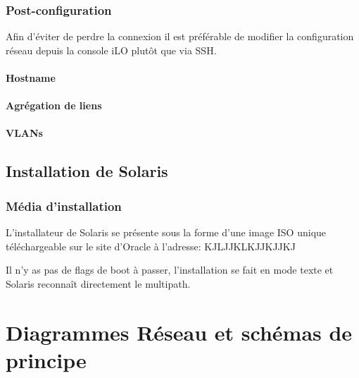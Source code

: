 \documentclass[a4paper,oneside]{report}
\begin{document}
\subsection{Post-configuration}
Afin d'éviter de perdre la connexion il est préférable de modifier la configuration réseau depuis la console iLO plutôt que via SSH.

\subsubsection{Hostname}

\subsubsection{Agrégation de liens}

\subsubsection{VLANs}

\section{Installation de Solaris} \label{sec:installsolaris}
\subsection{Média d'installation}
L'installateur de Solaris se présente sous la forme d'une image ISO unique téléchargeable sur le site d'Oracle à l'adresse:
KJLJJKLKJJKJJKJ

Il n'y as pas de flags de boot à passer, l'installation se fait en mode texte et Solaris reconnaît directement le multipath.

\chapter{Diagrammes Réseau et schémas de principe}
\end{document}
